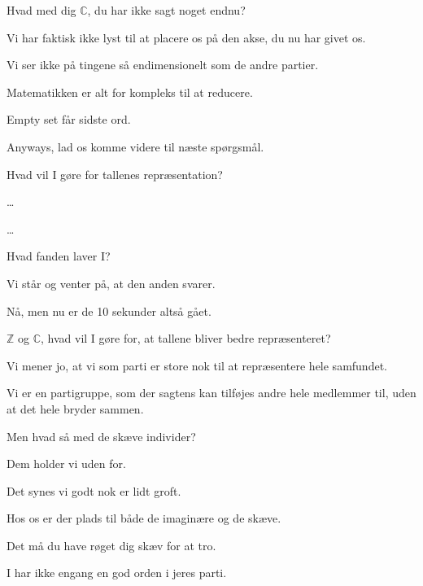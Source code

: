 \documentclass[a4paper,11pt]{article}
\begin{document}
\begin{sketch}
 Hvad med dig \ensuremath{\mathbb{C}}, du har ikke sagt noget endnu?

 Vi har faktisk ikke lyst til at placere os på den akse, du nu har givet os.

 Vi ser ikke på tingene så endimensionelt som de andre partier.

 Matematikken er alt for kompleks til at reducere.

 Empty set får sidste ord.


 Anyways, lad os komme videre til næste spørgsmål.

 Hvad vil I gøre for tallenes repræsentation?


\says{\ensuremath{\emptyset}} \ldots

 \ldots

 Hvad fanden laver I?

 Vi står og venter på, at den anden svarer.

 Nå, men nu er de 10 sekunder altså gået.

 \ensuremath{\mathbb{Z}} og \ensuremath{\mathbb{C}}, hvad vil I gøre for, at tallene bliver bedre repræsenteret?

 Vi mener jo, at vi som parti er store nok til at repræsentere hele samfundet.

 Vi er en partigruppe, som der sagtens kan tilføjes andre hele medlemmer til, uden at det hele bryder sammen.

 Men hvad så med de skæve individer?

 Dem holder vi uden for.

 Det synes vi godt nok er lidt groft.

 Hos os er der plads til både de imaginære og de skæve.

 Det må du have røget dig skæv for at tro.

 I har ikke engang en god orden i jeres parti.


\end{sketch}
\end{document}
